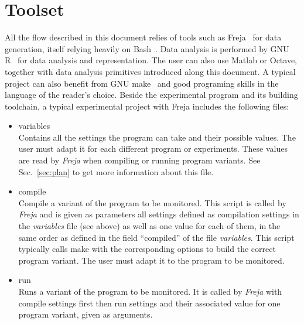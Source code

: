 \section{Toolset}
All the flow described in this document relies of tools such as Freja~\cite{freja} for data generation, itself relying heavily on Bash~\cite{garrels08}. Data analysis is performed by GNU R~\cite{r} for data analysis and representation. The user can also use Matlab or Octave, together with data analysis primitives introduced along this document. A typical project can also benefit from GNU make~\cite{gnu_make} and good programing skills in the language of the reader's choice. Beside the experimental program and its building toolchain, a typical experimental project with Freja includes the following files:
\begin{itemize}
\item variables\\
Contains all the settings the program can take and their possible values. The user must adapt it for each different program or experiments. These values are read by \emph{Freja} when compiling or running program variants. See Sec.~\ref{sec:plan} to get more information about this file. 
\item compile\\
Compile a variant of the program to be monitored. This script is called by \emph{Freja} and is given as parameters all settings defined as compilation settings in the \emph{variables} file (see above) as well as one value for each of them, in the same order as defined in the field ``compiled'' of the file \emph{variables}. This script typically calls make with the corresponding options to build the correct program variant. The user must adapt it to the program to be monitored.
\item run\\
Runs a variant of the program to be monitored. It is called by \emph{Freja} with compile settings first then run settings and their associated value for one program variant, given as arguments.

\end{itemize}

